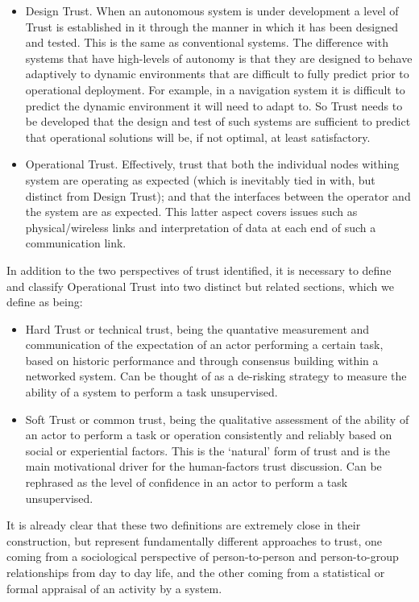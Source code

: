 \documentclass[runningheads,a4paper]{llncs}
\begin{document}
\begin{itemize}
  \item Design Trust. When an autonomous system is under development a level of Trust is established in it through the manner in which it has been designed and tested. This is the same as conventional systems. The difference with systems that have high-levels of autonomy is that they are designed to behave adaptively to dynamic environments that are difficult to fully predict prior to operational deployment. For example, in a navigation system it is difficult to predict the dynamic environment it will need to adapt to. So Trust needs to be developed that the design and test of such systems are sufficient to predict that operational solutions will be, if not optimal, at least satisfactory.

  \item Operational Trust. Effectively, trust that both the individual nodes withing system are operating as expected (which is inevitably tied in with, but distinct from Design Trust); and that the interfaces between the operator and the system are as expected. This latter aspect covers issues such as physical/wireless links and interpretation of data at each end of such a communication link.
\end{itemize}

In addition to the two perspectives of trust identified, it is necessary to define and classify Operational Trust into two distinct but related sections, which we define as being:
\begin{itemize}
  \item Hard Trust or technical trust, being the quantative measurement and communication of the expectation of an actor performing a certain task, based on historic performance and through consensus building within a networked system. Can be thought of as a de-risking strategy to measure the ability of a system to perform a task unsupervised.
  \item Soft Trust or common trust, being the qualitative assessment of the ability of an actor to perform a task or operation consistently and reliably based on social or experiential factors. This is the ‘natural’ form of trust and is the main motivational driver for the human-factors trust discussion. Can be rephrased as the level of confidence in an actor to perform a task unsupervised.
\end{itemize} 

It is already clear that these two definitions are extremely close in their construction, but represent fundamentally different approaches to trust, one coming from a sociological perspective of person-to-person and person-to-group relationships from day to day life, and the other coming from a statistical or formal appraisal of an activity by a system.
\end{document}
